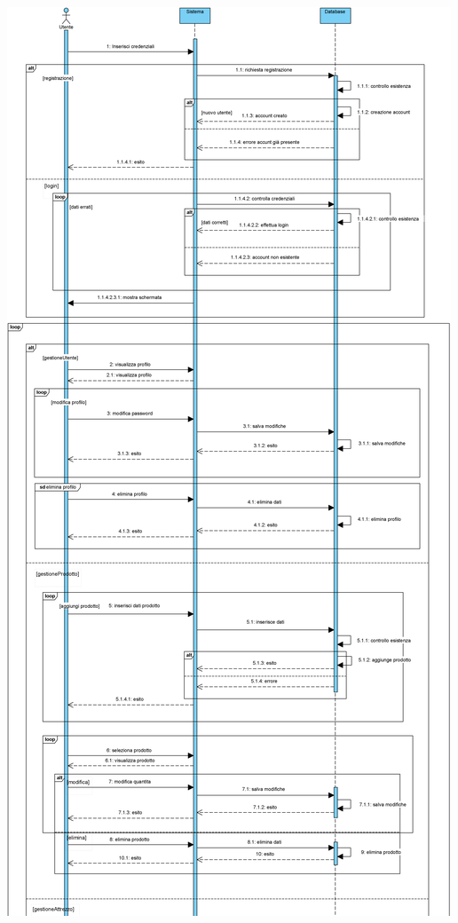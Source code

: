 \documentclass[a4paper, titlepage]{article}
\begin{document}
\includegraphics[scale=0.40]{Immagini/Sequence Diagram_Brew Day!_definitivo_1.png}
\newpage
\end{document}
